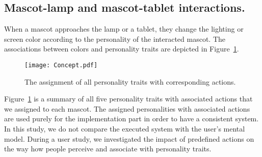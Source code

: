 \subsection*{Mascot-lamp and mascot-tablet interactions.}
When a mascot approaches the lamp or a tablet, they change the lighting or screen color according to the
personality of the interacted mascot.
The associations between colors and personality traits are depicted in Figure~\ref{fig:Concept}.

\begin{figure}[hbt!]
    \centering
    \texttt{[image: Concept.pdf]}
    \caption{The assignment of all personality traits with corresponding actions.}
    \label{fig:Concept}
\end{figure}

Figure~\ref{fig:Concept} is a summary of
all five personality traits with associated actions that we assigned to each mascot.
The assigned personalities with associated actions are used purely for the implementation part in order
to have a consistent system.
In this study, we do not compare the executed system with the user's mental model.
During a user study, we investigated the impact of predefined actions on the way how people
perceive and associate with personality traits.
